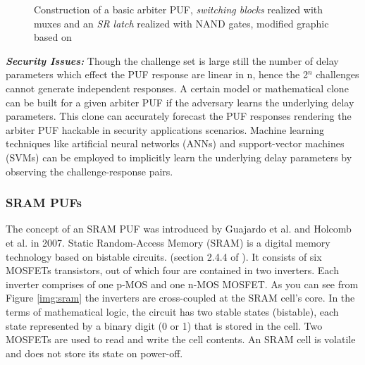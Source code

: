 \begin{figure}
	\centering
	\caption{Construction of a basic arbiter PUF, \emph{switching blocks} realized with muxes and an \emph{SR latch} realized with NAND gates, modified graphic based on \cite{17,18,38}}
	\label{img:arbiter}
\end{figure}

\textbf{\emph{Security Issues:}}
Though the challenge set is large still the number of delay parameters which effect the PUF response are linear in n, hence the 2$^n$ challenges cannot generate independent responses. A certain model or mathematical clone can be built for a given arbiter PUF if the adversary learns the underlying delay parameters. This clone can accurately forecast the PUF responses rendering the arbiter PUF hackable in security applications scenarios. Machine learning techniques like artificial neural
networks (ANNs) and support-vector machines (SVMs) can be employed to implicitly learn the underlying delay parameters by observing the challenge-response pairs.

\subsubsection{SRAM PUFs}
\label{srampufs}
The concept of an SRAM PUF was introduced by Guajardo et al. \cite{11} and Holcomb et al. \cite{50} in 2007. Static Random-Access Memory (SRAM) is a digital memory technology based on bistable circuits. (section 2.4.4 of \cite{17}). It consists of six MOSFETs transistors, out of which four are contained in two inverters. Each inverter comprises of one p-MOS and one n-MOS MOSFET. As you can see from Figure \ref{img:sram} the inverters are cross-coupled at the SRAM cell's core. In the terms of mathematical logic, the circuit has two stable states (bistable), each state represented by a binary
digit (0 or 1) that is stored in the cell. Two MOSFETs are used to read and write the cell contents. An SRAM cell is volatile and does not store its state on power-off.\\

